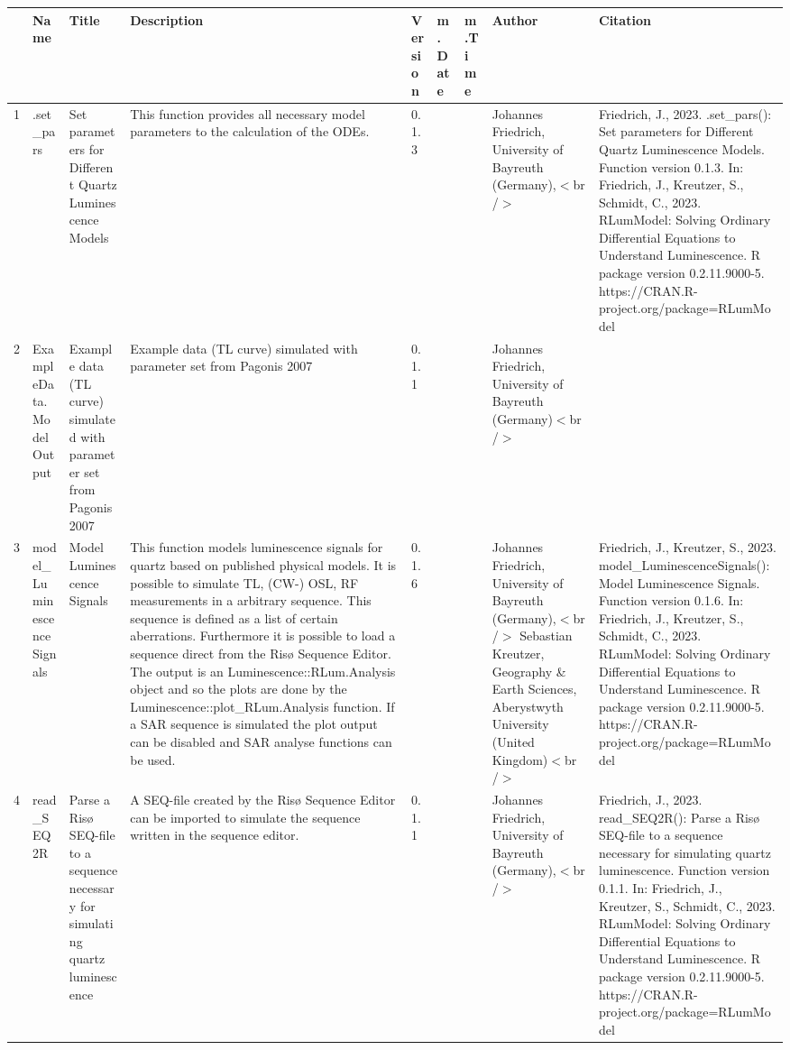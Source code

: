 \begin{table}[ht]
\centering
\begin{tabular}{rllllllll}
  \hline
 & Name & Title & Description & Version & m.Date & m.Time & Author & Citation \\ 
  \hline
1 & .set\_pars & Set parameters for Different Quartz Luminescence Models & This function provides all necessary model parameters to the calculation of the ODEs. & 0.1.3
 &  &  & Johannes Friedrich, University of Bayreuth (Germany),$<$br /$>$ & Friedrich, J., 2023. .set\_pars(): Set parameters for Different Quartz Luminescence Models. Function version 0.1.3. In: Friedrich, J., Kreutzer, S., Schmidt, C., 2023. RLumModel: Solving Ordinary Differential Equations to Understand Luminescence. R package version 0.2.11.9000-5. https://CRAN.R-project.org/package=RLumModel
 \\ 
  2 & ExampleData.ModelOutput & Example data (TL curve) simulated with parameter set from Pagonis 2007 & Example data (TL curve) simulated with parameter set from Pagonis 2007 & 0.1.1
 &  &  & Johannes Friedrich, University of Bayreuth (Germany)$<$br /$>$ &  \\ 
  3 & model\_LuminescenceSignals & Model Luminescence Signals & This function models luminescence signals for quartz based on published physical models. It is possible to simulate TL, (CW-) OSL, RF measurements in a arbitrary sequence. This sequence is defined as a  list  of certain aberrations. Furthermore it is possible to load a sequence direct from the Risø Sequence Editor. The output is an  Luminescence::RLum.Analysis  object and so the plots are done by the  Luminescence::plot\_RLum.Analysis  function. If a SAR sequence is simulated the plot output can be disabled and SAR analyse functions can be used. & 0.1.6
 &  &  & Johannes Friedrich, University of Bayreuth (Germany),$<$br /$>$ Sebastian Kreutzer, Geography \& Earth Sciences, Aberystwyth University (United Kingdom)$<$br /$>$ & Friedrich, J., Kreutzer, S., 2023. model\_LuminescenceSignals(): Model Luminescence Signals. Function version 0.1.6. In: Friedrich, J., Kreutzer, S., Schmidt, C., 2023. RLumModel: Solving Ordinary Differential Equations to Understand Luminescence. R package version 0.2.11.9000-5. https://CRAN.R-project.org/package=RLumModel
 \\ 
  4 & read\_SEQ2R & Parse a Risø SEQ-file to a sequence necessary for simulating quartz luminescence & A SEQ-file created by the Risø Sequence Editor can be imported to simulate the sequence written in the sequence editor. & 0.1.1
 &  &  & Johannes Friedrich, University of Bayreuth (Germany),$<$br /$>$ & Friedrich, J., 2023. read\_SEQ2R(): Parse a Risø SEQ-file to a sequence necessary for simulating quartz luminescence. Function version 0.1.1. In: Friedrich, J., Kreutzer, S., Schmidt, C., 2023. RLumModel: Solving Ordinary Differential Equations to Understand Luminescence. R package version 0.2.11.9000-5. https://CRAN.R-project.org/package=RLumModel

\end{tabular}
\end{table}
